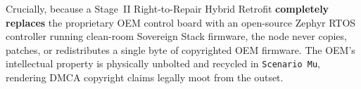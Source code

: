 Crucially, because a Stage~II Right-to-Repair Hybrid Retrofit \textbf{completely replaces} the proprietary OEM control board with an open-source Zephyr RTOS controller running clean-room Sovereign Stack firmware, the node never copies, patches, or redistributes a single byte of copyrighted OEM firmware. The OEM's intellectual property is physically unbolted and recycled in \texttt{Scenario Mu}, rendering DMCA copyright claims legally moot from the outset.
